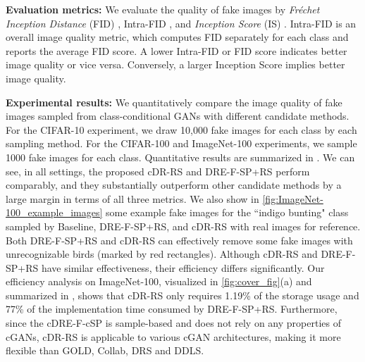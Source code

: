 \documentclass[final,12pt, 3p,times]{elsarticle}
\begin{document}
{\setlength{\parindent}{0cm} \textbf{Evaluation metrics:}} We evaluate the quality of fake images by \textit{Fr\'echet Inception Distance} (FID) \cite{heusel2017gans}, Intra-FID \cite{miyato2018cgans}, and \textit{Inception Score} (IS) \cite{salimans2016improved}. Intra-FID is an overall image quality metric, which computes FID separately for each class and reports the average FID score. A lower Intra-FID or FID score indicates better image quality or vice versa. Conversely, a larger Inception Score implies better image quality. 


{\setlength{\parindent}{0cm}\textbf{Experimental results:}} We quantitatively compare the image quality of fake images sampled from class-conditional GANs with different candidate methods. For the CIFAR-10 experiment, we draw 10,000 fake images for each class by each sampling method. For the CIFAR-100 and ImageNet-100 experiments, we sample 1000 fake images for each class. Quantitative results are summarized in . We can see, in all settings, the proposed cDR-RS and DRE-F-SP+RS perform comparably, and they substantially outperform other candidate methods by a large margin in terms of all three metrics. We also show in \cref{fig:ImageNet-100_example_images} some example fake images for the ``indigo bunting" class sampled by Baseline, DRE-F-SP+RS, and cDR-RS with real images for reference. Both DRE-F-SP+RS and cDR-RS can effectively remove some fake images with unrecognizable birds (marked by red rectangles). Although cDR-RS and DRE-F-SP+RS have similar effectiveness, their efficiency differs significantly. Our efficiency analysis on ImageNet-100, visualized in \cref{fig:cover_fig}(a) and summarized in  , shows that cDR-RS only requires 1.19\% of the storage usage and 77\% of the implementation time consumed by DRE-F-SP+RS. Furthermore, since the cDRE-F-cSP is sample-based and does not rely on any properties of cGANs, cDR-RS is applicable to various cGAN architectures, making it more flexible than GOLD, Collab, DRS and DDLS. 
\end{document}
